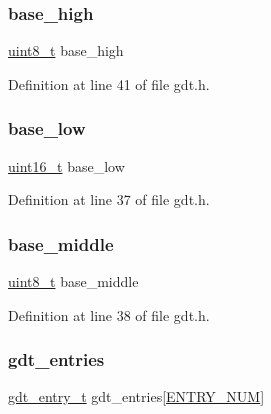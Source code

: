 \subsubsection{\texorpdfstring{base\+\_\+high}{base\_high}}
{\footnotesize\ttfamily \hyperlink{a00101_aba7bc1797add20fe3efdf37ced1182c5_aba7bc1797add20fe3efdf37ced1182c5}{uint8\+\_\+t} base\+\_\+high}



Definition at line 41 of file gdt.\+h.

\mbox{\label{a00068_a71e21ea67de59991e9a27666a1752a8f_a71e21ea67de59991e9a27666a1752a8f}} 
\subsubsection{\texorpdfstring{base\+\_\+low}{base\_low}}
{\footnotesize\ttfamily \hyperlink{a00101_a273cf69d639a59973b6019625df33e30_a273cf69d639a59973b6019625df33e30}{uint16\+\_\+t} base\+\_\+low}



Definition at line 37 of file gdt.\+h.

\mbox{\label{a00068_a6b67e86f6de9204d76adab79069aec29_a6b67e86f6de9204d76adab79069aec29}} 
\subsubsection{\texorpdfstring{base\+\_\+middle}{base\_middle}}
{\footnotesize\ttfamily \hyperlink{a00101_aba7bc1797add20fe3efdf37ced1182c5_aba7bc1797add20fe3efdf37ced1182c5}{uint8\+\_\+t} base\+\_\+middle}



Definition at line 38 of file gdt.\+h.

\mbox{\label{a00068_a29ae43d712f89a273f1e9e461b690218_a29ae43d712f89a273f1e9e461b690218}} 
\subsubsection{\texorpdfstring{gdt\+\_\+entries}{gdt\_entries}}
{\footnotesize\ttfamily \hyperlink{a00068_ab0b5c60e06a63669c783705278ff641e_ab0b5c60e06a63669c783705278ff641e}{gdt\+\_\+entry\+\_\+t} gdt\+\_\+entries\mbox{[}\hyperlink{a00068_abe29d44fbb5292a15af80cbb8e8a3a7d_abe29d44fbb5292a15af80cbb8e8a3a7d}{E\+N\+T\+R\+Y\+\_\+\+N\+UM}\mbox{]}}



